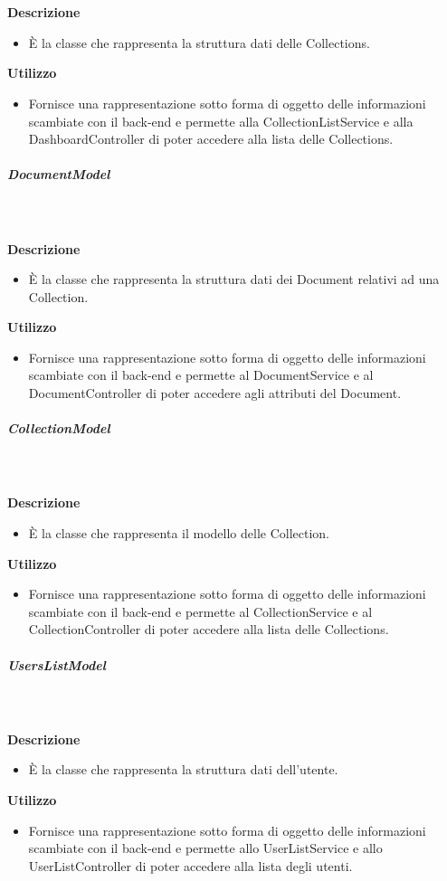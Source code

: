 				\textbf{\\ \\ Descrizione} 
					\begin{itemize}
						\item[] È la classe che rappresenta la struttura dati delle Collections.
					\end{itemize}      
				\textbf{Utilizzo}  
					\begin{itemize}
						\item[] Fornisce una rappresentazione sotto forma di oggetto delle informazioni scambiate con il back-end e permette alla CollectionListService e alla DashboardController di poter accedere alla lista delle Collections.
					\end{itemize}
			\subparagraph{DocumentModel}
				
				\textbf{\\ \\ Descrizione} 
					\begin{itemize}
						\item[] È la classe che rappresenta la struttura dati dei Document relativi ad una Collection.
					\end{itemize}      
				\textbf{Utilizzo}  
					\begin{itemize}
						\item[] Fornisce una rappresentazione sotto forma di oggetto delle informazioni scambiate con il back-end e permette al DocumentService e al DocumentController di poter accedere agli attributi del Document.
					\end{itemize}
			\subparagraph{CollectionModel}
				
				\textbf{\\ \\ Descrizione} 
					\begin{itemize}
						\item[] È la classe che rappresenta il modello delle Collection.
					\end{itemize}      
				\textbf{Utilizzo}  
					\begin{itemize}
						\item[] Fornisce una rappresentazione sotto forma di oggetto delle informazioni scambiate con il back-end e permette al CollectionService e al CollectionController di poter accedere alla lista delle Collections.
					\end{itemize}
			\subparagraph{UsersListModel}
				
				\textbf{\\ \\ Descrizione} 
					\begin{itemize}
						\item[] È la classe che rappresenta la struttura dati dell'utente.
					\end{itemize}      
				\textbf{Utilizzo}  
					\begin{itemize}
						\item[] Fornisce una rappresentazione sotto forma di oggetto delle informazioni scambiate con il back-end e permette allo UserListService e allo UserListController di poter accedere alla lista degli utenti.
					\end{itemize}
